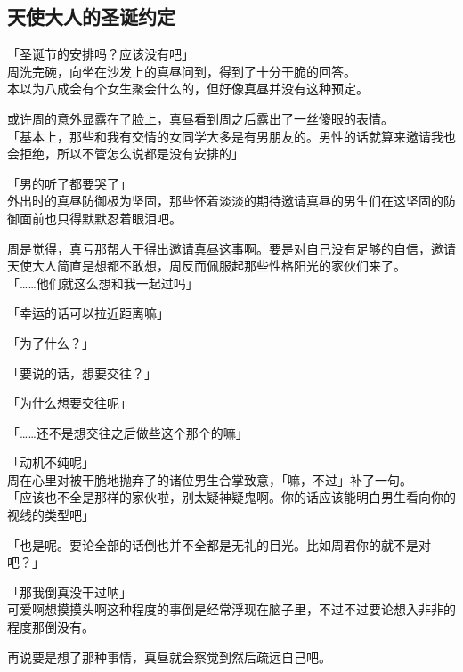 \subsection{天使大人的圣诞约定}

「圣诞节的安排吗？应该没有吧」\\

周洗完碗，向坐在沙发上的真昼问到，得到了十分干脆的回答。\\

本以为八成会有个女生聚会什么的，但好像真昼并没有这种预定。

或许周的意外显露在了脸上，真昼看到周之后露出了一丝傻眼的表情。\\

「基本上，那些和我有交情的女同学大多是有男朋友的。男性的话就算来邀请我也会拒绝，所以不管怎么说都是没有安排的」

「男的听了都要哭了」\\

外出时的真昼防御极为坚固，那些怀着淡淡的期待邀请真昼的男生们在这坚固的防御面前也只得默默忍着眼泪吧。

周是觉得，真亏那帮人干得出邀请真昼这事啊。要是对自己没有足够的自信，邀请天使大人简直是想都不敢想，周反而佩服起那些性格阳光的家伙们来了。\\

「……他们就这么想和我一起过吗」

「幸运的话可以拉近距离嘛」

「为了什么？」

「要说的话，想要交往？」

「为什么想要交往呢」

「……还不是想交往之后做些这个那个的嘛」

「动机不纯呢」\\

周在心里对被干脆地抛弃了的诸位男生合掌致意，「嘛，不过」补了一句。\\

「应该也不全是那样的家伙啦，别太疑神疑鬼啊。你的话应该能明白男生看向你的视线的类型吧」

「也是呢。要论全部的话倒也并不全都是无礼的目光。比如周君你的就不是对吧？」

「那我倒真没干过呐」\\

可爱啊想摸摸头啊这种程度的事倒是经常浮现在脑子里，不过不过要论想入非非的程度那倒没有。

再说要是想了那种事情，真昼就会察觉到然后疏远自己吧。\\

